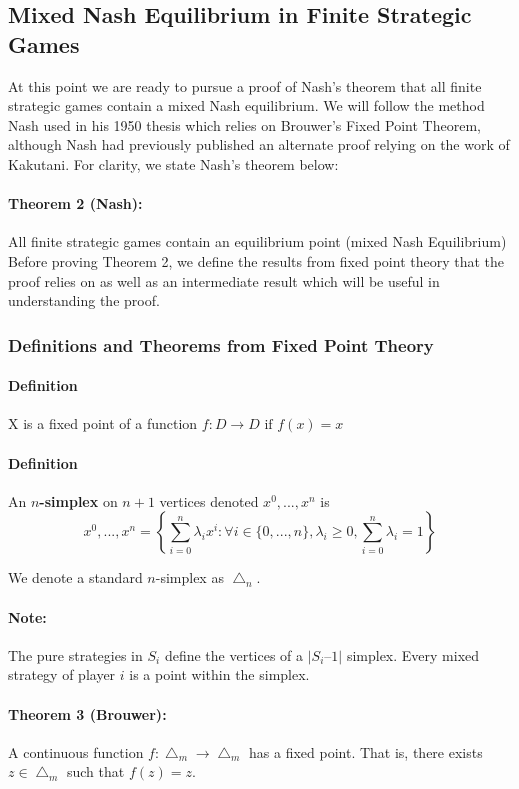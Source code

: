 \documentclass[12pt]{article}
\newcommand{\Note}{\paragraph{Note:}}
\newcommand{\Definition}{\paragraph{Definition}}
\begin{document}
\subsection{Mixed Nash Equilibrium in Finite Strategic Games}

At this point we are ready to pursue a proof of Nash's theorem that all finite strategic games contain a mixed Nash equilibrium. We will follow the method Nash used in his 1950 thesis which relies on Brouwer's Fixed Point Theorem, although Nash had previously published an alternate proof relying on the work of Kakutani. For clarity, we state Nash's theorem below:

\paragraph{Theorem 2 (Nash):} All finite strategic games contain an equilibrium point (mixed Nash Equilibrium)\\

Before proving Theorem 2, we define the results from fixed point theory that the proof relies on as well as an intermediate result which will be useful in understanding the proof.

\subsubsection{Definitions and Theorems from Fixed Point Theory}

\Definition X is a fixed point of a function $f: D \rightarrow D \text{ if } f(x) = x$

\Definition An \textbf{$n$-simplex}\cite{29} on $n+1$ vertices denoted $x^0,...,x^n$ is 
\begin{equation*}
x^0,...,x^n = \left \{ \sum\limits_{i=0}^n \lambda_i x^i : \forall i \in \{0,...,n\}, \lambda_i \geq 0, \sum\limits_{i = 0}^n \lambda_i = 1 \right \}
\end{equation*}

We denote a standard $n$-simplex as $\bigtriangleup_n$.

\Note The pure strategies in $S_i$ define the vertices of a $|S_i – 1|$ simplex. Every mixed strategy of player $i$ is a point within the simplex. 

\paragraph{Theorem 3 (Brouwer):} A continuous function $f: \bigtriangleup_m \rightarrow \bigtriangleup_m$ has a fixed point. That is, there exists $z \in \bigtriangleup_m$ such that $f(z) = z$.
\end{document}
